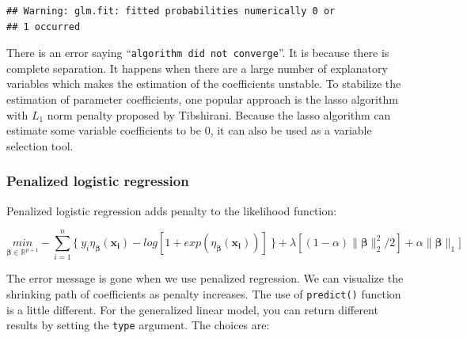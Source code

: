 \documentclass[12pt,]{krantz}
\makeatletter
\newenvironment{Shaded}{\begin{snugshade}}{\end{snugshade}}
\newcommand{\DataTypeTok}[1]{\textcolor[rgb]{0.27,0.27,0.27}{#1}}
\newcommand{\KeywordTok}[1]{\textcolor[rgb]{0.27,0.27,0.27}{\textbf{#1}}}
\newcommand{\NormalTok}[1]{#1}
\newcommand{\OperatorTok}[1]{\textcolor[rgb]{0.43,0.43,0.43}{\textbf{#1}}}
\newcommand{\StringTok}[1]{\textcolor[rgb]{0.5,0.5,0.5}{#1}}
\newenvironment{kframe}{%
\medskip{}
\setlength{\fboxsep}{.8em}
 \def\at@end@of@kframe{}%
 \ifinner\ifhmode%
  \def\at@end@of@kframe{\end{minipage}}%
  \begin{minipage}{\columnwidth}%
 \fi\fi%
 \def\FrameCommand##1{\hskip\@totalleftmargin \hskip-\fboxsep
 \colorbox{shadecolor}{##1}\hskip-\fboxsep
     \hskip-\linewidth \hskip-\@totalleftmargin \hskip\columnwidth}%
 \MakeFramed {\advance\hsize-\width
   \@totalleftmargin\z@ \linewidth\hsize
   \@setminipage}}%
 {\par\unskip\endMakeFramed%
 \at@end@of@kframe}
\renewenvironment{Shaded}{\begin{kframe}}{\end{kframe}}
\makeatother
\begin{document}
\begin{verbatim}
## Warning: glm.fit: fitted probabilities numerically 0 or
## 1 occurred
\end{verbatim}

There is an error saying ``\texttt{algorithm\ did\ not\ converge}''. It is because there is complete separation. It happens when there are a large number of explanatory variables which makes the estimation of the coefficients unstable. To stabilize the estimation of parameter coefficients, one popular approach is the lasso algorithm with \(L_1\) norm penalty proposed by Tibshirani\citep{Tibshirani1996}. Because the lasso algorithm can estimate some variable coefficients to be 0, it can also be used as a variable selection tool.

\hypertarget{penalized-logistic-regression-1}{%
\subsubsection{Penalized logistic regression}\label{penalized-logistic-regression-1}}

Penalized logistic regression adds penalty to the likelihood function:

\[
\underset{\mathbf{\beta}\in \mathbb{R}^{p+1}}{min} -\sum_{i=1}^{n}\{\ y_{i}\eta_{\mathbf{\beta}}(\mathbf{x_{i}})-log[1+exp(\eta_{\mathbf{\beta}}(\mathbf{x_{i}}))]\ \}+\lambda [(1-\alpha) \parallel \mathbf{\beta}\parallel _{2}^{2}/2] + \alpha \parallel \mathbf{\beta}\parallel _{1} ]
\]

\begin{Shaded}
\end{Shaded}

The error message is gone when we use penalized regression. We can visualize the shrinking path of coefficients as penalty increases. The use of \texttt{predict()} function is a little different. For the generalized linear model, you can return different results by setting the \texttt{type} argument. The choices are:
\end{document}
